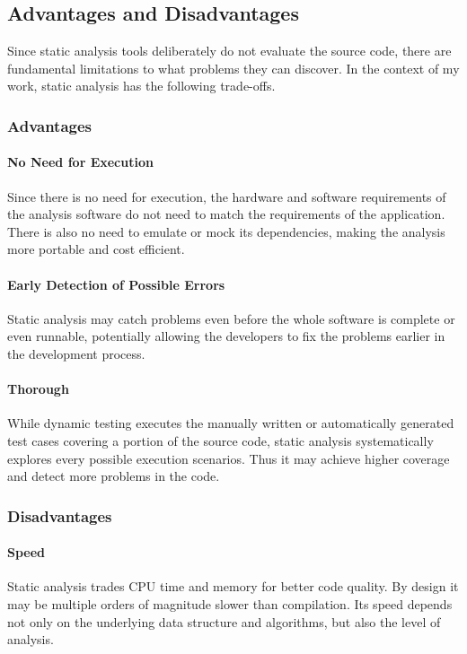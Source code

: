 \subsection{Advantages and Disadvantages}
Since static analysis tools deliberately do not evaluate the source code, there are fundamental limitations to what problems they can discover. In the context of my work, static analysis has the following trade-offs.

\subsubsection{Advantages}
\paragraph{No Need for Execution}
Since there is no need for execution, the hardware and software requirements of the analysis software do not need to match the requirements of the application. There is also no need to emulate or mock its dependencies, making the analysis more portable and cost efficient.

\paragraph{Early Detection of Possible Errors}
Static analysis may catch problems even before the whole software is complete or even runnable, potentially allowing the developers to fix the problems earlier in the development process.~\cite{xie}

\paragraph{Thorough}
While dynamic testing executes the manually written or automatically generated test cases covering a portion of the source code, static analysis systematically explores every possible execution scenarios. Thus it may achieve higher coverage and detect more problems in the code.~\cite{xie}

\subsubsection{Disadvantages}
\paragraph{Speed} Static analysis trades CPU time and memory for better code quality. By design it may be multiple orders of magnitude slower than compilation. Its speed depends not only on the underlying data structure and algorithms, but also the level of analysis.~\cite{clang}

